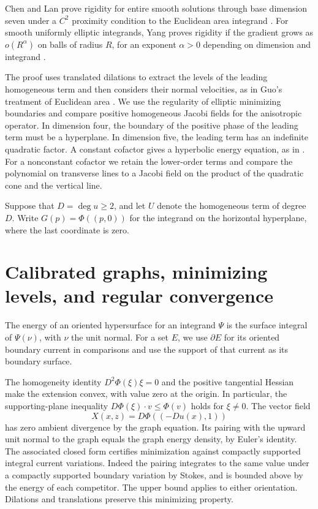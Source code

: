 \documentclass[11pt]{amsart}
\begin{document}
Chen and Lan prove rigidity for entire smooth solutions through
base dimension seven under a \(C^2\) proximity condition to the
Euclidean area integrand \cite[Theorem~1.1]{CL}. For smooth uniformly
elliptic integrands, Yang proves rigidity if the gradient grows as
\(o(R^\alpha)\) on balls of radius \(R\), for an exponent \(\alpha>0\)
depending on dimension and integrand \cite[Theorem~1.1]{Yang}.

The proof uses translated dilations to extract the levels of the
leading homogeneous term and then considers their normal velocities,
as in Guo's treatment of Euclidean area
\cite[Theorem~4.7 in the preprint]{Guo}. We use the regularity of
elliptic minimizing boundaries \cite[Part~I]{SSA} and compare
positive homogeneous Jacobi fields for the anisotropic operator.
In dimension four, the boundary of the positive phase of the leading
term must be a hyperplane. In dimension five, the leading term has
an indefinite quadratic factor. A constant cofactor gives a
hyperbolic energy equation, as in \cite[Remark~3.5]{Mooney6}. For a
nonconstant cofactor we retain the lower-order terms and compare the
polynomial on transverse lines to a Jacobi field on the product of
the quadratic cone and the vertical line.

Suppose that \(D=\deg u\ge2\), and let \(U\) denote the homogeneous
term of degree \(D\). Write \(G(p)=\Phi((p,0))\) for the integrand
on the horizontal hyperplane, where the last coordinate is zero.

\section{Calibrated graphs, minimizing levels, and regular convergence}\label{sec:blowdown}

The energy of an oriented hypersurface for an integrand \(\Psi\)
is the surface integral of \(\Psi(\nu)\), with \(\nu\) the unit
normal. For a set \(E\), we use \(\partial E\) for its oriented
boundary current in comparisons and use the support of that current
as its boundary surface.

The homogeneity identity \(D^2\Phi(\xi)\xi=0\) and the positive tangential
Hessian make the extension convex, with value zero at the origin. In
particular, the supporting-plane inequality
\(D\Phi(\xi)\cdot v\le\Phi(v)\) holds for \(\xi\ne0\). The vector field
\[
 X(x,z)=D\Phi((-Du(x),1))
\]
has zero ambient divergence by the graph equation. Its pairing with the
upward unit normal to the graph equals the graph energy density, by
Euler's identity. The associated closed form certifies minimization
against compactly supported integral current variations. Indeed the
pairing integrates to the same value under a compactly supported
boundary variation by Stokes, and is bounded above by the energy of
each competitor. The upper bound applies to either orientation.
Dilations and translations preserve this minimizing property.
\end{document}
